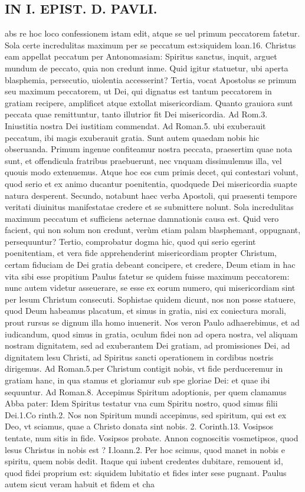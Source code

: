 \documentclass{article}
\begin{document}
\begin{pages}
\section*{IN I. EPIST. D. PAVLI. }
\marginpar{[ p.53 ]}\pstart abs re hoc loco confessionem istam edit, atque se uel primum peccatorem fatetur. Sola certe incredulitas maximum per se peccatum est:siquidem loan.16. Christus eam appellat peccatum per Antonomasiam: Spiritus sanctus, inquit, arguet mundum de   peccato, quia non credunt inme. Quid igitur statuetur, ubi aperta blasphemia, persecutio, uiolentia accesserint? Tertia, vocat Apostolus se primum seu maximum peccatorem, ut Dei, qui dignatus est tantum peccatorem in gratiam recipere, amplificet atque  extollat misericordiam. Quanto grauiora sunt peccata quae remittuntur, tanto illutrior fit Dei misericordia. Ad Rom.3. Iniustitia nostra Dei iustitiam commendat. Ad Roman.5. ubi exuberauit peccatum, ibi magis exuberauit gratia.  \pend\pstart Sunt autem quaedam nobis hic obseruanda. Primum ingenue confiteamur nostra peccata, praesertim quae nota sunt, et offendicula fratribus praebuerunt, nec vnquam dissimulemus illa, vel quouis modo extenuemus. Atque  hoc eos cum primis decet, qui contestari volunt, quod serio et ex animo ducantur poenitentia, quodquede Dei misericordia suapte natura desperent. Secundo, notabunt haec verba Apostoli, qui praesenti tempore veritati diuinitus manifestatae credere et se submittere nolunt. Sola incredulitas maximum peccatum et sufficiens aeternae damnationis causa est. Quid vero facient, qui non solum non credunt, verùm etiam palam blasphemant, oppugnant, persequuntur? Tertio, comprobatur dogma hic, quod qui serio egerint poenitentiam, et vera fide apprehenderint misericordiam propter Christum, certam fiduciam de Dei gratia debeant concipere, et credere, Deum etiam in hac vita sibi esse propitium Paulus fatetur se quidem fuisse maximum peccatorem: nunc autem videtur asseuerare, se esse ex eorum numero, qui misericordiam sint per lesum Christum consecuti. Sophistae quidem dicunt, nos non posse statuere, quod Deum habeamus placatum, et simus in gratia, nisi ex coniectura morali, prout rursus se dignum illa homo inuenerit. Nos veron Paulo adhaerebimus, et ad iudicandum, quod simus in gratia, oculum fidei non ad opera nostra, vel aliquam nostram dignitatem, sed ad exuberantem Dei gratiam, ad promissiones Dei, ad dignitatem lesu Christi, ad Spiritus sancti operationem in cordibus nostris dirigemus. Ad Roman.5.per Christum contigit nobis, vt fide perduceremur in gratiam hanc, in qua stamus et gloriamur sub spe gloriae Dei: et quae ibi sequuntur. Ad Roman.8. Accepimus Spiritum adoptionis, per quem clamamus Abba pater: Idem Spiritus testatur vna cum Spiritu nostro, quod simus filii Dei.1.Co rinth.2. Nos non Spiritum mundi accepimus, sed spiritum, qui est ex Deo, vt sciamus, quae a Christo donata sint nobis. 2. Corinth.13. Vosipsos tentate, num sitis in fide. Vosipsos probate. Annon cognoscitis vosmetipsos, quod lesus Christus in nobis est ? I.loann.2. Per hoc scimus, quod manet in nobis e spiritu, quem nobis dedit. Itaque  qui iubent credentes dubitare, remouent id, quod fidei proprium est: siquidem lubitatio et fides inter sese pugnant. Paulus autem sicut veram habuit et fidem et cha 
\end{pages}
\end{document}
